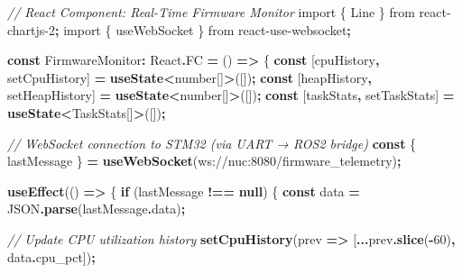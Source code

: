 \documentclass[
]{article}
\newenvironment{Shaded}{\begin{snugshade}}{\end{snugshade}}
\newcommand{\AttributeTok}[1]{\textcolor[rgb]{0.13,0.29,0.53}{#1}}
\newcommand{\BuiltInTok}[1]{#1}
\newcommand{\CommentTok}[1]{\textcolor[rgb]{0.56,0.35,0.01}{\textit{#1}}}
\newcommand{\ControlFlowTok}[1]{\textcolor[rgb]{0.13,0.29,0.53}{\textbf{#1}}}
\newcommand{\DataTypeTok}[1]{\textcolor[rgb]{0.13,0.29,0.53}{#1}}
\newcommand{\DecValTok}[1]{\textcolor[rgb]{0.00,0.00,0.81}{#1}}
\newcommand{\FunctionTok}[1]{\textcolor[rgb]{0.13,0.29,0.53}{\textbf{#1}}}
\newcommand{\ImportTok}[1]{#1}
\newcommand{\KeywordTok}[1]{\textcolor[rgb]{0.13,0.29,0.53}{\textbf{#1}}}
\newcommand{\NormalTok}[1]{#1}
\newcommand{\OperatorTok}[1]{\textcolor[rgb]{0.81,0.36,0.00}{\textbf{#1}}}
\newcommand{\StringTok}[1]{\textcolor[rgb]{0.31,0.60,0.02}{#1}}
\begin{document}
\begin{Shaded}
\begin{Highlighting}[]
\CommentTok{// React Component: Real{-}Time Firmware Monitor}
\ImportTok{import}\NormalTok{ \{ Line \} }\ImportTok{from} \StringTok{\textquotesingle{}react{-}chartjs{-}2\textquotesingle{}}\OperatorTok{;}
\ImportTok{import}\NormalTok{ \{ useWebSocket \} }\ImportTok{from} \StringTok{\textquotesingle{}react{-}use{-}websocket\textquotesingle{}}\OperatorTok{;}

\KeywordTok{const}\NormalTok{ FirmwareMonitor}\OperatorTok{:}\NormalTok{ React}\OperatorTok{.}\AttributeTok{FC} \OperatorTok{=}\NormalTok{ () }\KeywordTok{=\textgreater{}}\NormalTok{ \{}
  \KeywordTok{const}\NormalTok{ [cpuHistory}\OperatorTok{,}\NormalTok{ setCpuHistory] }\OperatorTok{=} \FunctionTok{useState}\OperatorTok{\textless{}}\DataTypeTok{number}\NormalTok{[]}\OperatorTok{\textgreater{}}\NormalTok{([])}\OperatorTok{;}
  \KeywordTok{const}\NormalTok{ [heapHistory}\OperatorTok{,}\NormalTok{ setHeapHistory] }\OperatorTok{=} \FunctionTok{useState}\OperatorTok{\textless{}}\DataTypeTok{number}\NormalTok{[]}\OperatorTok{\textgreater{}}\NormalTok{([])}\OperatorTok{;}
  \KeywordTok{const}\NormalTok{ [taskStats}\OperatorTok{,}\NormalTok{ setTaskStats] }\OperatorTok{=} \FunctionTok{useState}\OperatorTok{\textless{}}\NormalTok{TaskStats[]}\OperatorTok{\textgreater{}}\NormalTok{([])}\OperatorTok{;}

  \CommentTok{// WebSocket connection to STM32 (via UART → ROS2 bridge)}
  \KeywordTok{const}\NormalTok{ \{ lastMessage \} }\OperatorTok{=} \FunctionTok{useWebSocket}\NormalTok{(}\StringTok{\textquotesingle{}ws://nuc:8080/firmware\_telemetry\textquotesingle{}}\NormalTok{)}\OperatorTok{;}

  \FunctionTok{useEffect}\NormalTok{(() }\KeywordTok{=\textgreater{}}\NormalTok{ \{}
    \ControlFlowTok{if}\NormalTok{ (lastMessage }\OperatorTok{!==} \KeywordTok{null}\NormalTok{) \{}
      \KeywordTok{const}\NormalTok{ data }\OperatorTok{=} \BuiltInTok{JSON}\OperatorTok{.}\FunctionTok{parse}\NormalTok{(lastMessage}\OperatorTok{.}\AttributeTok{data}\NormalTok{)}\OperatorTok{;}

      \CommentTok{// Update CPU utilization history}
      \FunctionTok{setCpuHistory}\NormalTok{(prev }\KeywordTok{=\textgreater{}}\NormalTok{ [}\OperatorTok{...}\NormalTok{prev}\OperatorTok{.}\FunctionTok{slice}\NormalTok{(}\OperatorTok{{-}}\DecValTok{60}\NormalTok{)}\OperatorTok{,}\NormalTok{ data}\OperatorTok{.}\AttributeTok{cpu\_pct}\NormalTok{])}\OperatorTok{;}


\end{Highlighting}
\end{Shaded}
\end{document}
